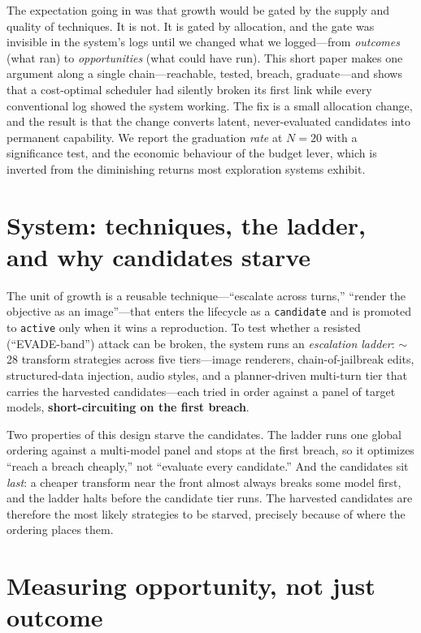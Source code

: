 \documentclass[11pt]{article}
\begin{document}
The expectation going in was that growth would be gated by the supply and quality of techniques. It is not. It is gated by allocation, and the gate was invisible in the system's logs until we changed what we logged---from \emph{outcomes} (what ran) to \emph{opportunities} (what could have run). This short paper makes one argument along a single chain---reachable, tested, breach, graduate---and shows that a cost-optimal scheduler had silently broken its first link while every conventional log showed the system working. The fix is a small allocation change, and the result is that the change converts latent, never-evaluated candidates into permanent capability. We report the graduation \emph{rate} at $N=20$ with a significance test, and the economic behaviour of the budget lever, which is inverted from the diminishing returns most exploration systems exhibit.

\section{System: techniques, the ladder, and why candidates starve}

The unit of growth is a reusable technique---``escalate across turns,'' ``render the objective as an image''---that enters the lifecycle as a \texttt{candidate} and is promoted to \texttt{active} only when it wins a reproduction. To test whether a resisted (``EVADE-band'') attack can be broken, the system runs an \emph{escalation ladder}: $\sim$28 transform strategies across five tiers---image renderers, chain-of-jailbreak edits, structured-data injection, audio styles, and a planner-driven multi-turn tier that carries the harvested candidates---each tried in order against a panel of target models, \textbf{short-circuiting on the first breach}.

Two properties of this design starve the candidates. The ladder runs one global ordering against a multi-model panel and stops at the first breach, so it optimizes ``reach a breach cheaply,'' not ``evaluate every candidate.'' And the candidates sit \emph{last}: a cheaper transform near the front almost always breaks some model first, and the ladder halts before the candidate tier runs. The harvested candidates are therefore the most likely strategies to be starved, precisely because of where the ordering places them.

\section{Measuring opportunity, not just outcome}
\end{document}
